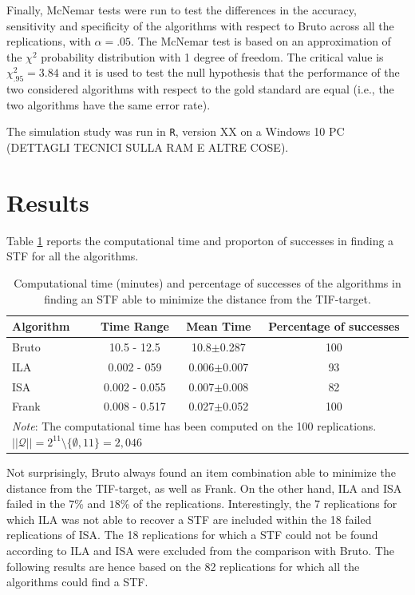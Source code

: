\documentclass[12pt, a4paper, titilepage]{article}
\begin{document}
Finally, McNemar tests were run to test the differences in the accuracy, sensitivity and specificity of the algorithms with respect to Bruto across all the replications, with $\alpha = .05$. The McNemar test is based on an approximation of the $\chi^2$ probability distribution with 1 degree of freedom. The critical value is $\chi_{.95}^2 = 3.84$ and it is used to test the null hypothesis that the performance of the two considered algorithms with respect to the gold standard  are equal (i.e., the two algorithms have the same error rate). 

\normalcolor

The simulation study was run in \texttt{R}, version XX on a Windows 10 PC (DETTAGLI TECNICI SULLA RAM E ALTRE COSE). 

\section*{Results}

Table \ref{tab:desc} reports the computational time and proporton of successes in finding a STF for all the algorithms.

\begin{table}[!h]
	\centering 
	\caption{\label{tab:desc} Computational time (minutes) and percentage of successes of the algorithms in finding an STF able to minimize the distance from the TIF-target.}
	\begin{tabular}{l c c c}
		\hline
		Algorithm	&	Time Range	&	Mean Time	&	Percentage of successes	\\\hline
		Bruto	&	10.5 - 12.5	&	10.8$\pm$0.287	&	100	\\
		ILA	&	0.002 - 059	&	0.006$\pm$0.007	&	93	\\
		ISA	& 0.002 - 0.055	&	0.007$\pm$0.008	&	82	\\
		Frank	&	0.008 - 0.517	&	0.027$\pm$0.052	&	100	\\\hline
		\multicolumn{4}{p{10cm}}{\emph{Note}: The computational time has been computed on the 100 replications. $||\mathcal{Q}|| = 2^{11} \setminus \{\emptyset, 11\} = 2,046$}
	\end{tabular}
\end{table}

Not surprisingly, Bruto always found an item combination able to minimize the distance from the TIF-target, as well as Frank. On the other hand, ILA and ISA failed in the $7$\% and $18$\% of the replications. 
Interestingly, the 7 replications for which ILA was not able to recover a STF are included within the 18 failed replications of ISA. The 18 replications for which a STF could not be found according to ILA and ISA were excluded from the comparison with Bruto. The following results are hence based on the 82 replications for which all the algorithms could find a STF. 
\end{document}
